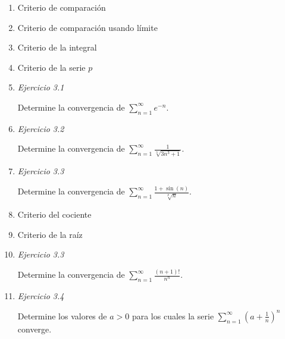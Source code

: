 \documentclass[12pt,oneside]{book}
\begin{document}
\begin{enumerate}


 \item Criterio de comparación
 
  \vspace{100pt}
 
 
 \item Criterio de comparación usando límite

   \vspace{100pt}
 
 
 \item Criterio de la integral
 
   \vspace{100pt}
   
   
 \item Criterio de la serie $p$
 
 
 \newpage
 
 \item \textit{Ejercicio 3.1}
 
 Determine la convergencia de $\displaystyle \sum_{n=1}^{\infty}e^{-n}$.
 
 \vspace{180pt}
 
 
 
 \item \textit{Ejercicio 3.2}
 
 Determine la convergencia de $\displaystyle \sum_{n=1}^{\infty}\frac{1}{\sqrt[3]{3n^3+1}}$.
 
 
 \vspace{180pt}
 
 \item \textit{Ejercicio 3.3}
 
 Determine la convergencia de $\displaystyle \sum_{n=1}^{\infty}\frac{1+\sin(n)}{\sqrt[p]{n}}$.
 
 
 \newpage
 
 \vspace{220pt}
 
 

 \item Criterio del cociente
 
  \vspace{100pt}
 
 
 \item Criterio de la raíz

   \vspace{120pt}
   
   
 
 \item \textit{Ejercicio 3.3}
 
 Determine la convergencia de $\displaystyle \sum_{n=1}^{\infty}\frac{(n+1)!}{n^n}$.

 
 
   \vspace{120pt}
   
   
 
 \item \textit{Ejercicio 3.4}
 
 Determine los valores de $a>0$ para los cuales la serie $\displaystyle \sum_{n=1}^{\infty} \left( a + \frac{1}{n}\right)^{n}$ converge.

 
\end{enumerate}
\end{document}
